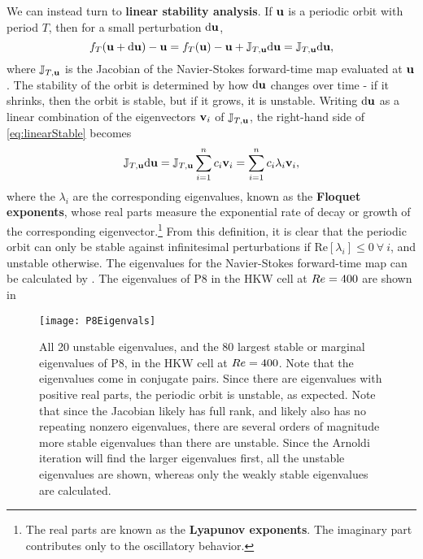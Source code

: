 We can instead turn to {\bf linear stability analysis}. If $\mathbf{u}$ is a periodic orbit with period $T$, then for a small perturbation ${\bf \textrm{d}}\mathbf{u}$, 
\begin{equation}\label{eq:linearStable}
 f_T(\mathbf{u} + {\bf \textrm{d}}\mathbf{u}) - \mathbf{u} =  f_T(\mathbf{u}) - \mathbf{u} + \mathbb{J}_{T,\mathbf{u}}{\bf \textrm{d}}\mathbf{u} =  \mathbb{J}_{T,\mathbf{u}}{\bf \textrm{d}}\mathbf{u},
\end{equation} 
where $ \mathbb{J}_{T,\mathbf{u}}$ is the Jacobian of the Navier-Stokes forward-time map evaluated at $\mathbf{u}$. The stability of the orbit is determined by how  ${\bf \textrm{d}}\mathbf{u}$ changes over time - if it shrinks, then the orbit is stable, but if it grows, it is unstable. Writing  ${\bf \textrm{d}}\mathbf{u}$ as a linear combination of the eigenvectors $\mathbf{v}_i$ of  $ \mathbb{J}_{T,\mathbf{u}}$, the right-hand side of \eqref{eq:linearStable} becomes
\begin{equation}\label{eq:oneOrbit}
 \mathbb{J}_{T,\Vector{u}}{\bf \textrm{d}}\Vector{u} =  \mathbb{J}_{T,\Vector{u}}\sum{i = 1}{n}{c_i\Vector{v}_i} = \sum{i = 1}{n}{c_i\lambda_i\Vector{v}_i},
\end{equation}  
where the $\lambda_i$ are the corresponding eigenvalues, known as the {\bf Floquet exponents}, whose real parts measure the exponential rate of decay or growth of the corresponding eigenvector.\footnote{The real parts are known as the {\bf Lyapunov exponents}. The imaginary part contributes only to the oscillatory behavior.}   From this definition, it is clear that the periodic orbit can only be stable against infinitesimal perturbations if $\textrm{Re}[\lambda_i]  \leq 0~\forall~i$, and unstable otherwise. The eigenvalues for the Navier-Stokes forward-time map can be calculated by . The eigenvalues of P8 in the HKW cell at $Re=400$ are shown in 

\begin{figure}[h]
\texttt{[image: P8Eigenvals]}
\caption{All 20 unstable eigenvalues, and the 80 largest stable or marginal eigenvalues of P8, in the HKW cell at $Re=400$. Note that the eigenvalues come in conjugate pairs. Since there are eigenvalues with positive real parts, the periodic orbit is unstable, as expected. Note that since the Jacobian likely has full rank, and likely also has no repeating nonzero eigenvalues, there are several orders of magnitude more stable eigenvalues than there are unstable. Since the Arnoldi iteration will find the larger eigenvalues first, all the unstable eigenvalues are shown, whereas only the weakly stable eigenvalues are calculated.}\label{fig:P8Eigenvals}
\end{figure}

